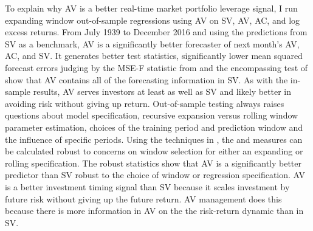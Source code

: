 To explain why AV is a better real-time market portfolio leverage signal, I run expanding window out-of-sample regressions using AV on SV, AV, AC, and log excess returns. From July 1939 to December 2016 and using the predictions from SV as a benchmark, AV is a significantly better forecaster of next month’s AV, AC, and SV. It generates better \citet{Diebold1995} test statistics, significantly lower mean squared forecast errors judging by the MSE-F statistic from \citet{mccracken_asymptotics_2007} and the encompassing test of \citet{harvey_tests_1998} show that AV contains all of the forecasting information in SV. As with the in-sample results, AV serves investors at least as well as SV and likely better in avoiding risk without giving up return. Out-of-sample testing always raises questions about model specification, recursive expansion versus rolling window parameter estimation, choices of the training period and prediction window and the influence of specific periods. Using the techniques in \citet{rossi_out--sample_2012}, the \citet{Diebold1995} and \citet{harvey_tests_1998} measures can be calculated robust to concerns on window selection for either an expanding or rolling specification.
The \citet{rossi_out--sample_2012}  robust statistics show that AV is a significantly better predictor than SV robust to the choice of window or regression specification. %
AV is a better investment timing signal than SV because it scales investment by future risk without giving up the future return. AV management does this because there is more information in AV on the the risk-return dynamic than in SV.

